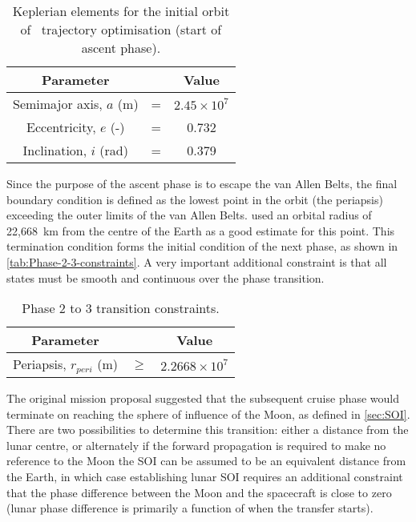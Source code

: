 \begin{table}[ht]
\caption{Keplerian elements for the initial orbit of \BW\ trajectory optimisation (start of ascent phase).} \label{tab:Phase-2-constraints}
\centering
\begin{tabular} {ccc}\toprule
Parameter & & Value\\\midrule
Semimajor axis, $a$ (m) &=& $2.45\times 10^7$\\
Eccentricity, $e$ (-) &=& 0.732\\
Inclination, $i$ (rad) &=& 0.379\\\bottomrule
\end{tabular}
\end{table}

Since the purpose of the ascent phase is to escape the van Allen Belts, the final boundary condition is defined as the lowest point in the orbit (the periapsis) exceeding the outer limits of the van Allen Belts. \textcite{Letterio_thesis} used an orbital radius of 22,668~km from the centre of the Earth as a good estimate for this point. This termination condition forms the initial condition of the next phase, as shown in \autoref{tab:Phase-2-3-constraints}. A very important additional constraint is that all states must be smooth and continuous over the phase transition.

\begin{table}[ht]
\caption{Phase 2 to 3 transition constraints.} \label{tab:Phase-2-3-constraints}
\centering
\begin{tabular} {ccc}\toprule
Parameter & & Value\\\midrule
Periapsis, $r_{peri}$ (m) &$\ge$& $2.2668\times 10^7$\\\bottomrule
\end{tabular}
\end{table}

The original mission proposal \parencite{Roeser2006} suggested that the subsequent cruise phase would terminate on reaching the sphere of influence of the Moon, as defined in \autoref{sec:SOI}. There are two possibilities to determine this transition: either a distance from the lunar centre, or alternately if the forward propagation is required to make no reference to the Moon the SOI can be assumed to be an equivalent distance from the Earth, in which case establishing lunar SOI requires an additional constraint that the phase difference between the Moon and the spacecraft is close to zero (lunar phase difference is primarily a function of when the transfer starts). 

